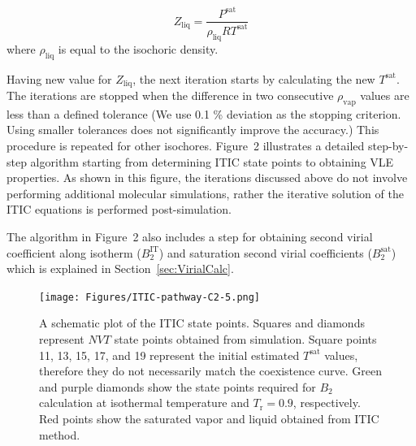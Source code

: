 \documentclass[5p,times]{elsarticle}
\begin{document}
\begin{equation}
{Z_{\mathrm{liq}}} = \frac{P^\mathrm{sat}}{\rho_\mathrm{liq}RT^\mathrm{sat}}  
\label{eqn:zliq}
\end{equation}
where $\rho_\mathrm{liq}$ is equal to the isochoric density.

Having new value for $Z_{\mathrm{liq}}$, the next iteration starts by calculating the new $T^\mathrm{sat}$. The iterations are stopped when the difference in two consecutive $\rho_\mathrm{vap}$ values are less than a defined tolerance (We use 0.1 \% deviation as the stopping criterion. Using smaller tolerances does not significantly improve the accuracy.) This procedure is repeated for other isochores. Figure~2 illustrates a detailed step-by-step algorithm starting from determining ITIC state points to obtaining VLE properties. As shown in this figure, the iterations discussed above do not involve performing additional molecular simulations, rather the iterative solution of the ITIC equations is performed post-simulation. 

The algorithm in Figure~2 also includes a step for obtaining second virial coefficient along isotherm ($B_2^\mathrm{IT}$) and saturation second virial coefficients ($B_2^\mathrm{sat}$) which is explained in Section~\ref{sec:VirialCalc}.
\begin{figure}
\texttt{[image: Figures/ITIC-pathway-C2-5.png]}
\caption{A schematic plot of the ITIC state points. Squares and diamonds represent $NVT$ state points obtained from simulation. Square points 11, 13, 15, 17, and 19 represent the initial estimated $T^\mathrm{sat}$ values, therefore they do not necessarily match the coexistence curve. Green and purple diamonds show the state points required for $B_2$ calculation at isothermal temperature and $T_\mathrm{r}=0.9$, respectively. Red points show the saturated vapor and liquid obtained from ITIC method.}
\label{fig:ITICpathway}
\end{figure}
\end{document}
